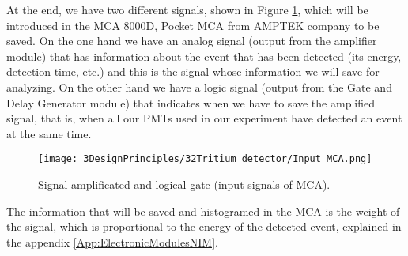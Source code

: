 At the end, we have two different signals, shown in Figure \ref{fig:InputSignalsMCA}, which will be introduced in the MCA 8000D, Pocket MCA from AMPTEK company \cite{DataSheetMCA} to be saved. On the one hand we have an analog signal (output from the amplifier module) that has information about the event that has been detected (its energy, detection time, etc.) and this is the signal whose information we will save for analyzing. On the other hand we have a logic signal (output from the Gate and Delay Generator module) that indicates when we have to save the amplified signal, that is, when all our PMTs used in our experiment have detected an event at the same time.

\begin{figure}[htbp]
\centering
\texttt{[image: 3DesignPrinciples/32Tritium\_detector/Input\_MCA.png]}
\caption{Signal amplificated and logical gate (input signals of MCA).\label{fig:InputSignalsMCA}}
\end{figure}


The information that will be saved and histogramed in the MCA is the weight of the signal, which is proportional to the energy of the detected event, explained in the appendix \ref{App:ElectronicModulesNIM}. %

